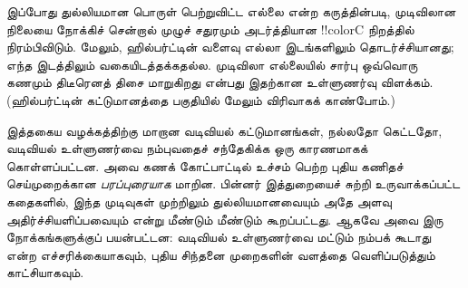 \documentclass[../../../include/open-logic-section]{subfiles}
\begin{document}
இப்போது துல்லியமான பொருள் பெற்றுவிட்ட எல்லை என்ற கருத்தின்படி,
முடிவிலான நிலையை நோக்கிச் சென்றால் முழுச் சதுரமும் அடர்த்தியான
!!{colorC} நிறத்தில் நிரம்பிவிடும். மேலும், ஹில்பர்ட்டின் வளைவு
எல்லா இடங்களிலும் தொடர்ச்சியானது; எந்த இடத்திலும்
வகையிடத்தக்கதல்ல. முடிவிலா எல்லையில் சார்பு ஒவ்வொரு கணமும்
திடீரெனத் திசை மாறுகிறது என்பது இதற்கான உள்ளுணர்வு விளக்கம்.
(ஹில்பர்ட்டின் கட்டுமானத்தை 
பகுதியில் மேலும் விரிவாகக் காண்போம்.)

இத்தகைய வழக்கத்திற்கு மாறான வடிவியல் கட்டுமானங்கள், நல்லதோ
கெட்டதோ, வடிவியல் உள்ளுணர்வை நம்புவதைச் சந்தேகிக்க ஒரு
காரணமாகக் கொள்ளப்பட்டன. அவை கணக் கோட்பாட்டில் உச்சம் பெற்ற
புதிய கணிதச் செய்முறைக்கான \emph{பரப்புரையாக} மாறின.
பின்னர் இத்துறையைச் சுற்றி உருவாக்கப்பட்ட கதைகளில், இந்த முடிவுகள்
முற்றிலும் துல்லியமானவையும் அதே அளவு அதிர்ச்சியளிப்பவையும்
என்று மீண்டும் மீண்டும் கூறப்பட்டது. ஆகவே அவை இரு நோக்கங்களுக்குப்
பயன்பட்டன: வடிவியல் உள்ளுணர்வை மட்டும் நம்பக் கூடாது என்ற
எச்சரிக்கையாகவும், புதிய சிந்தனை முறைகளின் வளத்தை வெளிப்படுத்தும்
காட்சியாகவும்.
\end{document}
